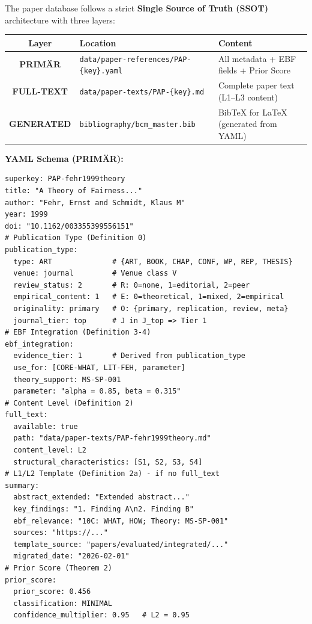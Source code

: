 \begin{tcolorbox}[colback=green!5!white, colframe=green!75!black,
    title=\textbf{SSOT Data Architecture: Paper Database}]

The paper database follows a strict \textbf{Single Source of Truth (SSOT)} architecture
with three layers:

\begin{table}[H]
\centering
\begin{tabular}{@{}clp{5.5cm}@{}}
\toprule
\textbf{Layer} & \textbf{Location} & \textbf{Content} \\
\midrule
\textbf{PRIMÄR} & \texttt{data/paper-references/PAP-\{key\}.yaml} &
    All metadata + EBF fields + Prior Score \\
\textbf{FULL-TEXT} & \texttt{data/paper-texts/PAP-\{key\}.md} &
    Complete paper text (L1--L3 content) \\
\textbf{GENERATED} & \texttt{bibliography/bcm\_master.bib} &
    BibTeX for LaTeX (generated from YAML) \\
\bottomrule
\end{tabular}
\end{table}

\textbf{YAML Schema (PRIMÄR):}
\begin{verbatim}
superkey: PAP-fehr1999theory
title: "A Theory of Fairness..."
author: "Fehr, Ernst and Schmidt, Klaus M"
year: 1999
doi: "10.1162/003355399556151"
# Publication Type (Definition 0)
publication_type:
  type: ART              # {ART, BOOK, CHAP, CONF, WP, REP, THESIS}
  venue: journal         # Venue class V
  review_status: 2       # R: 0=none, 1=editorial, 2=peer
  empirical_content: 1   # E: 0=theoretical, 1=mixed, 2=empirical
  originality: primary   # O: {primary, replication, review, meta}
  journal_tier: top      # J in J_top => Tier 1
# EBF Integration (Definition 3-4)
ebf_integration:
  evidence_tier: 1       # Derived from publication_type
  use_for: [CORE-WHAT, LIT-FEH, parameter]
  theory_support: MS-SP-001
  parameter: "alpha = 0.85, beta = 0.315"
# Content Level (Definition 2)
full_text:
  available: true
  path: "data/paper-texts/PAP-fehr1999theory.md"
  content_level: L2
  structural_characteristics: [S1, S2, S3, S4]
# L1/L2 Template (Definition 2a) - if no full_text
summary:
  abstract_extended: "Extended abstract..."
  key_findings: "1. Finding A\n2. Finding B"
  ebf_relevance: "10C: WHAT, HOW; Theory: MS-SP-001"
  sources: "https://..."
  template_source: "papers/evaluated/integrated/..."
  migrated_date: "2026-02-01"
# Prior Score (Theorem 2)
prior_score:
  prior_score: 0.456
  classification: MINIMAL
  confidence_multiplier: 0.95   # L2 = 0.95
\end{verbatim}


\end{tcolorbox}
